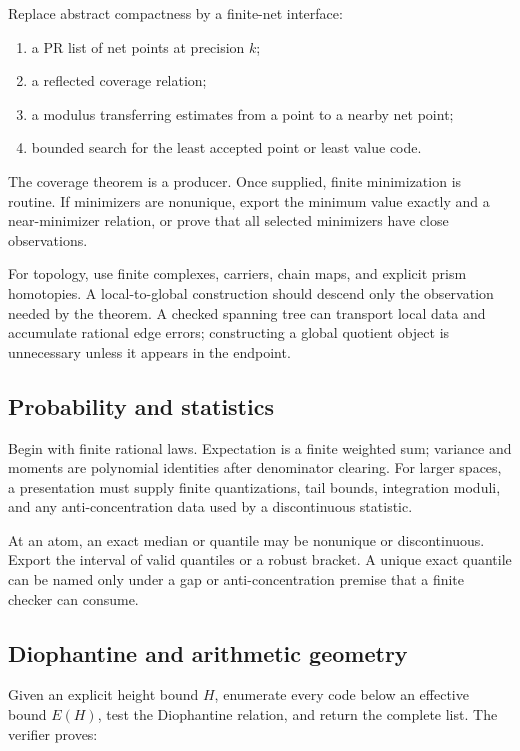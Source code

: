 Replace abstract compactness by a finite-net interface:

\begin{enumerate}[label=(\alph*)]
\item a PR list of net points at precision \(k\);
\item a reflected coverage relation;
\item a modulus transferring estimates from a point to a nearby net point;
\item bounded search for the least accepted point or least value code.
\end{enumerate}

The coverage theorem is a producer.  Once supplied, finite minimization is
routine.  If minimizers are nonunique, export the minimum value exactly and a
near-minimizer relation, or prove that all selected minimizers have close
observations.

For topology, use finite complexes, carriers, chain maps, and explicit prism
homotopies.  A local-to-global construction should descend only the observation
needed by the theorem.  A checked spanning tree can transport local data and
accumulate rational edge errors; constructing a global quotient object is
unnecessary unless it appears in the endpoint.

\subsection{Probability and statistics}

Begin with finite rational laws.  Expectation is a finite weighted sum;
variance and moments are polynomial identities after denominator clearing.
For larger spaces, a presentation must supply finite quantizations, tail
bounds, integration moduli, and any anti-concentration data used by a
discontinuous statistic.

At an atom, an exact median or quantile may be nonunique or discontinuous.
Export the interval of valid quantiles or a robust bracket.  A unique exact
quantile can be named only under a gap or anti-concentration premise that a
finite checker can consume.

\subsection{Diophantine and arithmetic geometry}

Given an explicit height bound \(H\), enumerate every code below an effective
bound \(E(H)\), test the Diophantine relation, and return the complete list.
The verifier proves:

